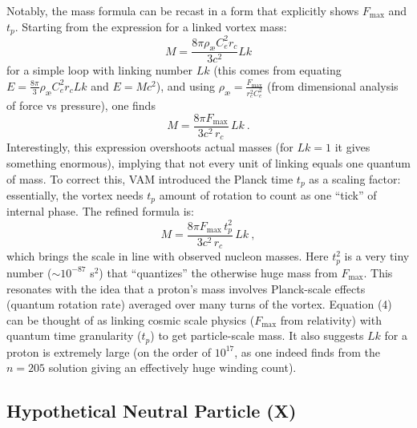Notably, the mass formula can be recast in a form that explicitly shows $F_{\max}$ and $t_p$. Starting from the expression for a linked vortex mass:
\begin{equation}
    M = \frac{8\pi \rho_{\text{\ae}} C_e^2 r_c}{3c^2} Lk
\end{equation}
for a simple loop with linking number $Lk$ (this comes from equating $E=\frac{8\pi}{3}\rho_{\text{\ae}}C_e^2 r_c Lk$ and $E=Mc^2$), and using $\rho_{\text{\ae}} = \frac{F_{\max}}{r_c^2 C_e^2}$ (from dimensional analysis of force vs pressure), one finds
\begin{equation}
    M = \frac{8\pi F_{\max}}{3 c^2\,r_c}\,Lk~.
\end{equation}
Interestingly, this expression overshoots actual masses (for $Lk=1$ it gives something enormous), implying that not every unit of linking equals one quantum of mass. To correct this, VAM introduced the Planck time $t_p$ as a scaling factor: essentially, the vortex needs $t_p$ amount of rotation to count as one ``tick'' of internal phase. The refined formula is:
\begin{equation}
    M = \frac{8\pi F_{\max}\,t_p^2}{3 c^2\,r_c}\,Lk~,
\end{equation}
which brings the scale in line with observed nucleon masses. Here $t_p^2$ is a very tiny number ($\sim10^{-87}$ s$^2$) that ``quantizes'' the otherwise huge mass from $F_{\max}$. This resonates with the idea that a proton's mass involves Planck-scale effects (quantum rotation rate) averaged over many turns of the vortex. Equation (4) can be thought of as linking cosmic scale physics ($F_{\max}$ from relativity) with quantum time granularity ($t_p$) to get particle-scale mass. It also suggests $Lk$ for a proton is extremely large (on the order of $10^{17}$, as one indeed finds from the $n=205$ solution giving an effectively huge winding count).

\subsection{Hypothetical Neutral Particle (X)}

